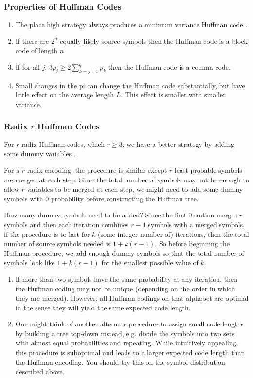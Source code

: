 \documentclass{article}
\begin{document}
\subsubsection{Properties of Huffman Codes}

\begin{enumerate}
    \item The place high strategy always produces a minimum variance Huffman code .
    \item If there are $2^{n}$ equally likely source symbols then the Huffman code is a block code of length $n$.
    \item If for all $j$, $3p_{j} \geq 2 \sum_{k=j+1}^{q}p_{k}$ then the Huffman code is a comma code.
    \item Small changes in the pi can change the Huffman code substantially, but have little effect on the average length $L$. This effect is smaller with smaller variance.
\end{enumerate}

\subsubsection{Radix $r$ Huffman Codes}
For $r$ radix Huffman codes, which $r \geq 3$, we have a better strategy by adding some dummy variables \cite{cmuLec8}.

For a $r$ radix encoding, the procedure is similar except $r$ least probable symbols are merged at each step. Since the total number of symbols may not be enough to allow $r$ variables to be merged at each step, we might need to add some dummy symbols with $0$ probability before constructing the Huffman tree.

How many dummy symbols need to be added? Since the first iteration merges $r$ symbols and then each iteration combines $r-1$ symbols with a merged symbols, if the procedure is to last for $k$ (some integer number of) iterations, then the total number of source symbols needed is $1+k(r-1)$. So before beginning the Huffman procedure, we add enough dummy symbols so that the total number of symbols look like $1+k(r-1)$ for the smallest possible value of $k$.

\begin{enumerate}
    \item If more than two symbols have the same probability at any iteration, then the Huffman coding may not be unique (depending on the order in which they are merged). However, all Huffman codings on that alphabet are optimal in the sense they will yield the same expected code length.	
    \item 	One might think of another alternate procedure to assign small code lengths by building a tree top-down instead, e.g. divide the symbols into two sets with almost equal probabilities and repeating. While intuitively appealing, this procedure is suboptimal and leads to a larger expected code length than the Huffman encoding. You should try this on the symbol distribution described above.
\end{enumerate}
\end{document}
